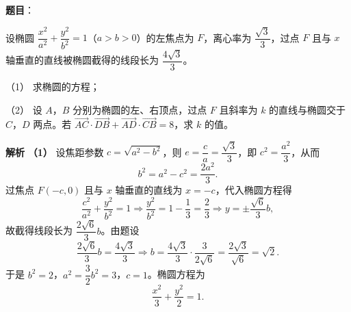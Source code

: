 \begin{answer}

\textbf{题目}：

设椭圆 $\dfrac{x^2}{a^2}+\dfrac{y^2}{b^2}=1$（$a>b>0$）的左焦点为 $F$，离心率为 $\dfrac{\sqrt3}3$，过点 $F$ 且与 $x$ 轴垂直的直线被椭圆截得的线段长为 $\dfrac{4\sqrt3}3$。

（1） 求椭圆的方程；

（2） 设 $A$，$B$ 分别为椭圆的左、右顶点，过点 $F$ 且斜率为 $k$ 的直线与椭圆交于 $C$，$D$ 两点。若 $\overrightarrow{AC}\cdot\overrightarrow{DB}+\overrightarrow{AD}\cdot\overrightarrow{CB}=8$，求 $k$ 的值。

\textbf{解析}
\textbf{（1）} 设焦距参数 $c=\sqrt{a^2-b^2}$，则 $e=\dfrac ca=\dfrac{\sqrt3}3$，即 $c^2=\dfrac{a^2}3$，从而
\nopagebreak[4]
\[b^2=a^2-c^2=\frac{2a^2}3.\]
过焦点 $F(-c,0)$ 且与 $x$ 轴垂直的直线为 $x=-c$，代入椭圆方程得
\nopagebreak[4]
\[\frac{c^2}{a^2}+\frac{y^2}{b^2}=1\Longrightarrow\frac{y^2}{b^2}=1-\frac13=\frac23\Longrightarrow y=\pm\frac{\sqrt6}3b,\]
故截得线段长为 $\dfrac{2\sqrt6}3b$。由题设
\nopagebreak[4]
\[\frac{2\sqrt6}3b=\frac{4\sqrt3}3\Longrightarrow b=\frac{4\sqrt3}{3}\cdot\frac3{2\sqrt6}=\frac{2\sqrt3}{\sqrt6}=\sqrt2.\]
于是 $b^2=2$，$a^2=\dfrac32b^2=3$，$c=1$。椭圆方程为
\nopagebreak[4]
\[\frac{x^2}3+\frac{y^2}2=1.\]


\end{answer}
